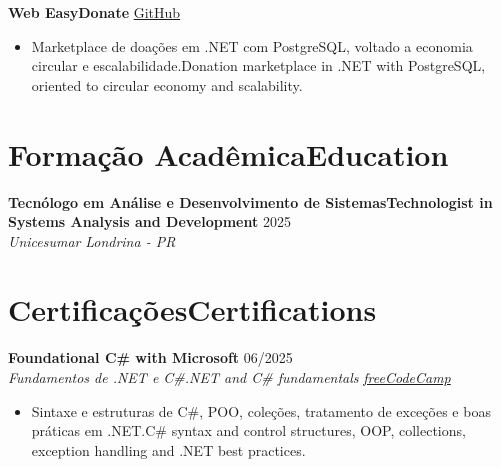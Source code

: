 \documentclass[a4paper,10pt]{article}
\newcommand{\tr}[2]{\ifdefined\CVPT #2\else #1\fi}
\newcommand{\entry}[4]{
  \noindent\textbf{#1} \hfill #2 \\
  \noindent\textit{#3} \hfill \textit{#4} \\
  \vspace{2pt}
}
\newcommand{\project}[2]{
  \noindent\textbf{#1} \hfill #2 \\
  \vspace{2pt}
}
\begin{document}
\project{Web EasyDonate}{\href{https://github.com/H0wZy/web.easydonate}{\faLink \space GitHub}}
\vspace{-0.4em}
\begin{itemize}[leftmargin=*, itemsep=2pt]
\setlength\itemsep{0em}
\item \tr{Donation marketplace in .NET with PostgreSQL, oriented to circular economy and scalability.}{Marketplace de doações em .NET com PostgreSQL, voltado a economia circular e escalabilidade.}
\end{itemize}

\section*{\tr{Education}{Formação Acadêmica}}

\entry{\tr{Technologist in Systems Analysis and Development}{Tecnólogo em Análise e Desenvolvimento de Sistemas}}{2025}{Unicesumar}{Londrina - PR}

\section*{\tr{Certifications}{Certificações}}

\entry{Foundational C\# with Microsoft}{06/2025}{\tr{.NET and C\# fundamentals}{Fundamentos de .NET e C\#}}{\href{https://freecodecamp.org/certification/h0wzy/foundational-c-sharp-with-microsoft}{\faLink \space freeCodeCamp}}
\vspace{-0.4em}
\begin{itemize}[leftmargin=*, itemsep=2pt]
\setlength\itemsep{0em}
\item \tr{C\# syntax and control structures, OOP, collections, exception handling and .NET best practices.}{Sintaxe e estruturas de C\#, POO, coleções, tratamento de exceções e boas práticas em .NET.}
\end{itemize}
\end{document}
